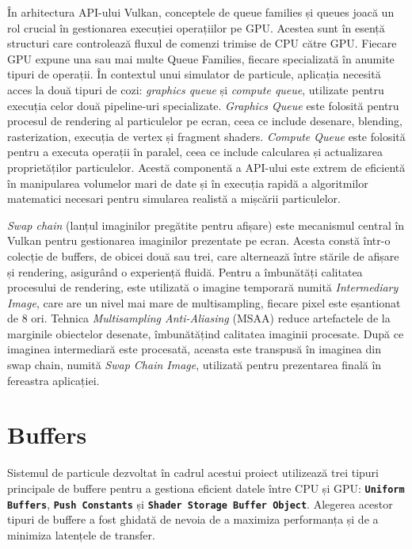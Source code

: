 În arhitectura API-ului Vulkan, conceptele de queue families și queues joacă un rol crucial în gestionarea execuției operațiilor pe GPU. Acestea sunt în esență structuri care controlează fluxul de comenzi trimise de CPU către GPU. Fiecare GPU expune una sau mai multe Queue Families, fiecare specializată în anumite tipuri de operații. În contextul unui simulator de particule, aplicația necesită acces la două tipuri de cozi: \textit{graphics queue} și \textit{compute queue}, utilizate pentru execuția celor două pipeline-uri specializate. \textit{Graphics Queue} este folosită pentru procesul de rendering al particulelor pe ecran, ceea ce include desenare, blending, rasterization, execuția de vertex și fragment shaders. \textit{Compute Queue} este folosită pentru a executa operații în paralel, ceea ce include calcularea și actualizarea proprietăților particulelor. Acestă componentă a API-ului este extrem de eficientă în manipularea volumelor mari de date și în execuția rapidă a algoritmilor matematici necesari pentru simularea realistă a mișcării particulelor. 

\textit{Swap chain} (lanțul imaginilor pregătite pentru afișare) este mecanismul central în Vulkan pentru gestionarea imaginilor prezentate pe ecran. Acesta constă într-o colecție de buffers, de obicei două sau trei, care alternează între stările de afișare și rendering, asigurând o experiență fluidă. Pentru a îmbunătăți calitatea procesului de rendering, este utilizată o imagine temporară numită \textit{Intermediary Image}, care are un nivel mai mare de multisampling, fiecare pixel este eșantionat de 8 ori. Tehnica \textit{Multisampling Anti-Aliasing} \cite{MSAA_citation} (MSAA) reduce artefactele de la marginile obiectelor desenate, îmbunătățind calitatea imaginii procesate. După ce imaginea intermediară este procesată, aceasta este transpusă în imaginea din swap chain, numită \textit{Swap Chain Image}, utilizată pentru prezentarea finală în fereastra aplicației. 

\section{Buffers}
Sistemul de particule dezvoltat în cadrul acestui proiect utilizează trei tipuri principale de buffere pentru a gestiona eficient datele între CPU și GPU: \textbf{\texttt{Uniform Buffers}}, \textbf{\texttt{Push Constants}} și \textbf{\texttt{Shader Storage Buffer Object}}. Alegerea acestor tipuri de buffere a fost ghidată de nevoia de a maximiza performanța și de a minimiza latențele de transfer. 

